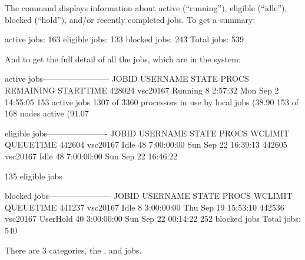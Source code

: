  The  command displays information about active (``running''),
  eligible (``idle''), blocked (``hold''), and/or recently completed jobs. To get
  a summary:

\begin{prompt}
active jobs: 163
eligible jobs: 133
blocked jobs: 243
Total jobs:  539
\end{prompt}

\fi
\fi

\ifantwerpen
And to get the full detail of all the jobs, which are in the system:

\begin{prompt}
active jobs------------------------
JOBID     USERNAME  STATE PROCS REMAINING          STARTTIME
428024    vsc20167  Running   8   2:57:32  Mon Sep  2 14:55:05
153 active jobs 1307 of 3360 processors in use by local jobs (38.90%
153 of 168 nodes active      (91.07%

eligible jobs----------------------
JOBID     USERNAME  STATE PROCS   WCLIMIT            QUEUETIME
442604    vsc20167   Idle  48  7:00:00:00  Sun Sep 22 16:39:13
442605    vsc20167   Idle  48  7:00:00:00  Sun Sep 22 16:46:22

135 eligible jobs

blocked jobs-----------------------
JOBID   USERNAME     STATE PROCS WCLIMIT            QUEUETIME
441237  vsc20167      Idle   8 3:00:00:00 Thu Sep 19 15:53:10
442536  vsc20167  UserHold  40 3:00:00:00 Sun Sep 22 00:14:22
252 blocked jobs
Total jobs:  540
\end{prompt}
\fi

\ifgent
\else
\ifbrussel
\else
  There are 3 categories, the ,  and  jobs.


